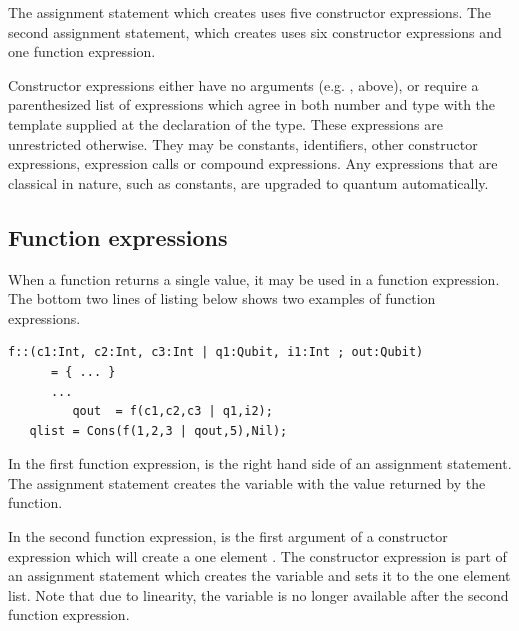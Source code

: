 The assignment statement which creates  uses five constructor
expressions. The second assignment statement, which creates
 uses six constructor expressions and one function expression.

Constructor expressions either have no arguments
 (e.g. ,  above), or
require a parenthesized list of expressions which agree in both
number and type with the template supplied at the declaration of the
type. These expressions are unrestricted otherwise. They may be constants,
identifiers, other constructor expressions, expression calls or compound
expressions. Any expressions that are classical in nature, such as constants,
are upgraded to quantum automatically.

\subsection{Function expressions}\label{subsec:expressioncalls}
When a function returns a single value, it may be used in a
function expression. The bottom two lines of listing below shows
two examples of function expressions.
\begin{lstlisting}[style=linqpl]
      f::(c1:Int, c2:Int, c3:Int | q1:Qubit, i1:Int ; out:Qubit)
      = { ... }
      ...
         qout  = f(c1,c2,c3 | q1,i2);
   qlist = Cons(f(1,2,3 | qout,5),Nil);
\end{lstlisting}
In the first function expression,  is the right hand side of
an assignment statement. The assignment statement
 creates the variable 
with the value returned by the function.

In the second function expression,  is the first argument of a
constructor expression which will create a one element .
The constructor expression is part of an assignment statement which
creates the variable  and sets it to
the one element list. Note that due to linearity, the variable
 is no longer available after the second function expression.

